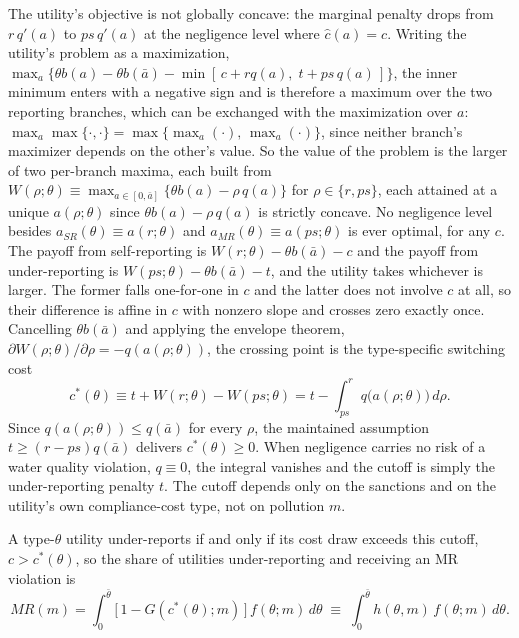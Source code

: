 \documentclass[12pt]{article}
\begin{document}
	The utility's objective is not globally concave: the marginal penalty drops from $r\,q'(a)$ to $ps\,q'(a)$ at the negligence level where $\hat{c}(a) = c$. Writing the utility's problem as a maximization, $\max_a\{\theta b(a) - \theta b(\bar a) - \min[\,c + r q(a),\; t + ps\,q(a)\,]\}$, the inner minimum enters with a negative sign and is therefore a maximum over the two reporting branches, which can be exchanged with the maximization over $a$: $\max_a \max\{\cdot,\cdot\} = \max\{\max_a(\cdot),\, \max_a(\cdot)\}$, since neither branch's maximizer depends on the other's value. So the value of the problem is the larger of two per-branch maxima, each built from $W(\rho;\theta) \equiv \max_{a \in [0,\bar{a}]} \{\theta b(a) - \rho\, q(a)\}$ for $\rho \in \{r, ps\}$, each attained at a unique $a(\rho;\theta)$ since $\theta b(a) - \rho\, q(a)$ is strictly concave. No negligence level besides $a_{SR}(\theta) \equiv a(r;\theta)$ and $a_{MR}(\theta) \equiv a(ps;\theta)$ is ever optimal, for any $c$. The payoff from self-reporting is $W(r;\theta) - \theta b(\bar{a}) - c$ and the payoff from under-reporting is $W(ps;\theta) - \theta b(\bar{a}) - t$, and the utility takes whichever is larger. The former falls one-for-one in $c$ and the latter does not involve $c$ at all, so their difference is affine in $c$ with nonzero slope and crosses zero exactly once. Cancelling $\theta b(\bar{a})$ and applying the envelope theorem, $\partial W(\rho;\theta)/\partial\rho = -q(a(\rho;\theta))$, the crossing point is the type-specific switching cost
	\begin{equation}\label{eq:cstar}
		c^*(\theta) \equiv t + W(r;\theta) - W(ps;\theta) = t - \int_{ps}^{r} q\big(a(\rho;\theta)\big)\, d\rho.
	\end{equation}
	Since $q(a(\rho;\theta)) \le q(\bar{a})$ for every $\rho$, the maintained assumption $t \ge (r-ps)q(\bar{a})$ delivers $c^*(\theta) \ge 0$. When negligence carries no risk of a water quality violation, $q \equiv 0$, the integral vanishes and the cutoff is simply the under-reporting penalty $t$. The cutoff depends only on the sanctions and on the utility's own compliance-cost type, not on pollution $m$.

	A type-$\theta$ utility under-reports if and only if its cost draw exceeds this cutoff, $c > c^*(\theta)$, so the share of utilities under-reporting and receiving an MR violation is
	\begin{equation}\label{eq:MRm}
		MR(m) = \int_0^{\bar\theta} \big[\,1 - G(c^*(\theta);m)\,\big]\, f(\theta;m)\, d\theta \;\equiv\; \int_0^{\bar\theta} h(\theta,m)\, f(\theta;m)\, d\theta.
	\end{equation}
	
\end{document}
